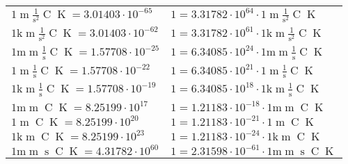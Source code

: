 \begin{center}
\begin{longtable}{l l}
{\color{black}$1 \bm{\mathrm{ }}{\operatorname{m}}\frac1{\operatorname{s}^2}{\operatorname{C}}{\operatorname{K}} = 3.01403\cdot10^{-65} $}   & {\color{black}$ 1 = 3.31782\cdot10^{64} \cdot 1 \bm{\mathrm{ }}{\operatorname{m}}\frac1{\operatorname{s}^2}{\operatorname{C}}{\operatorname{K}}$}  \\
{\color{gray}$1 \bm{\mathrm{ k}}{\operatorname{m}}\frac1{\operatorname{s}^2}{\operatorname{C}}{\operatorname{K}} = 3.01403\cdot10^{-62} $}   & {\color{gray}$ 1 = 3.31782\cdot10^{61} \cdot 1 \bm{\mathrm{ k}}{\operatorname{m}}\frac1{\operatorname{s}^2}{\operatorname{C}}{\operatorname{K}}$}  \\
{\color{gray}$1 \bm{\mathrm{ m}}{\operatorname{m}}\frac1{\operatorname{s}}{\operatorname{C}}{\operatorname{K}} = 1.57708\cdot10^{-25} $}   & {\color{gray}$ 1 = 6.34085\cdot10^{24} \cdot 1 \bm{\mathrm{ m}}{\operatorname{m}}\frac1{\operatorname{s}}{\operatorname{C}}{\operatorname{K}}$}  \\
{\color{black}$1 \bm{\mathrm{ }}{\operatorname{m}}\frac1{\operatorname{s}}{\operatorname{C}}{\operatorname{K}} = 1.57708\cdot10^{-22} $}   & {\color{black}$ 1 = 6.34085\cdot10^{21} \cdot 1 \bm{\mathrm{ }}{\operatorname{m}}\frac1{\operatorname{s}}{\operatorname{C}}{\operatorname{K}}$}  \\
{\color{gray}$1 \bm{\mathrm{ k}}{\operatorname{m}}\frac1{\operatorname{s}}{\operatorname{C}}{\operatorname{K}} = 1.57708\cdot10^{-19} $}   & {\color{gray}$ 1 = 6.34085\cdot10^{18} \cdot 1 \bm{\mathrm{ k}}{\operatorname{m}}\frac1{\operatorname{s}}{\operatorname{C}}{\operatorname{K}}$}  \\
{\color{gray}$1 \bm{\mathrm{ m}}{\operatorname{m}}{}{\operatorname{C}}{\operatorname{K}} = 8.25199\cdot10^{17} $}   & {\color{gray}$ 1 = 1.21183\cdot10^{-18} \cdot 1 \bm{\mathrm{ m}}{\operatorname{m}}{}{\operatorname{C}}{\operatorname{K}}$}  \\
{\color{black}$1 \bm{\mathrm{ }}{\operatorname{m}}{}{\operatorname{C}}{\operatorname{K}} = 8.25199\cdot10^{20} $}   & {\color{black}$ 1 = 1.21183\cdot10^{-21} \cdot 1 \bm{\mathrm{ }}{\operatorname{m}}{}{\operatorname{C}}{\operatorname{K}}$}  \\
{\color{gray}$1 \bm{\mathrm{ k}}{\operatorname{m}}{}{\operatorname{C}}{\operatorname{K}} = 8.25199\cdot10^{23} $}   & {\color{gray}$ 1 = 1.21183\cdot10^{-24} \cdot 1 \bm{\mathrm{ k}}{\operatorname{m}}{}{\operatorname{C}}{\operatorname{K}}$}  \\
{\color{gray}$1 \bm{\mathrm{ m}}{\operatorname{m}}{\operatorname{s}}{\operatorname{C}}{\operatorname{K}} = 4.31782\cdot10^{60} $}   & {\color{gray}$ 1 = 2.31598\cdot10^{-61} \cdot 1 \bm{\mathrm{ m}}{\operatorname{m}}{\operatorname{s}}{\operatorname{C}}{\operatorname{K}}$}  \\

\end{longtable}
\end{center}
